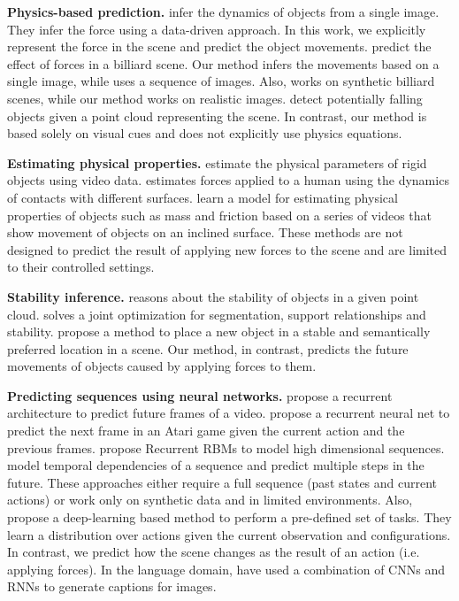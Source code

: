 \documentclass[runningheads]{llncs}
\begin{document}
\textbf{Physics-based prediction.} \cite{mottaghi16} infer the dynamics of objects from a single image. They infer the force using a data-driven approach. In this work, we explicitly represent the force in the scene and predict the object movements. \cite{Fragkiadaki16} predict the effect of forces in a billiard scene. Our method infers the movements based on a single image, while \cite{Fragkiadaki16} uses a sequence of images. Also, \cite{Fragkiadaki16} works on synthetic billiard scenes, while our method works on realistic images. \cite{zheng14} detect potentially falling objects given a point cloud representing the scene. In contrast, our method is based solely on visual cues and does not explicitly use physics equations. 


\textbf{Estimating physical properties.} \cite{Bhat2002} estimate the physical parameters of rigid objects using video data. \cite{brubaker2009} estimates forces applied to a human using the dynamics of contacts with different surfaces. \cite{wu15} learn a model for estimating physical properties of objects such as mass and friction based on a series of videos that show movement of objects on an inclined surface. These methods are not designed to predict the result of applying new forces to the scene and are limited to their controlled settings. 

\textbf{Stability inference.} \cite{zheng13} reasons about the stability of objects in a given point cloud. \cite{jia13} solves a joint optimization for segmentation, support relationships and stability. \cite{jiang12} propose a method to place a new object in a stable and semantically preferred location in a scene. Our method, in contrast, predicts the future movements of objects caused by applying forces to them.

\textbf{Predicting sequences using neural networks.} \cite{ranzato14} propose a recurrent architecture to predict future frames of a video. \cite{oh15} propose a recurrent neural net to predict the next frame in an Atari game given the current action and the previous frames. \cite{sutskever08} propose Recurrent RBMs to model high dimensional sequences. \cite{michalski14} model temporal dependencies of a sequence and predict multiple steps in the future. These approaches either require a full sequence (past states and current actions) or work only on synthetic data and in limited environments. Also, \cite{levine15} propose a deep-learning based method to perform a pre-defined set of tasks. They learn a distribution over actions given the current observation and configurations. In contrast, we predict how the scene changes as the result of an action (i.e. applying forces). In the language domain, \cite{karpathy15,vinyals15} have used a combination of CNNs and RNNs to generate captions for images.
\end{document}
